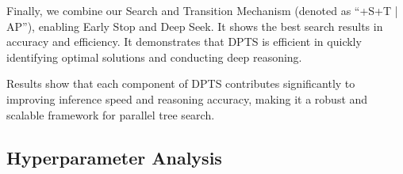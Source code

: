 Finally, we combine our Search and Transition Mechanism (denoted as ``+S+T | AP''), enabling Early Stop and Deep Seek. It shows the best search results in accuracy and efficiency. 
It demonstrates that DPTS is efficient in quickly identifying optimal solutions and conducting deep reasoning. 

Results show that each component of DPTS contributes significantly to improving inference speed and reasoning accuracy, making it a robust and scalable framework for parallel tree search. 




\subsection{Hyperparameter Analysis}

\begin{table}
    \centering
    \caption{Hyperparameter $\lambda_\mathrm{es}$ and $\lambda_\mathrm{ds}$ in transition thresholds $\theta_\mathrm{es}$ and $\theta_\mathrm{ds}$. ``ES (Early Stop)~\%'' and ``DS (Deep Seek)~\%'' are the ratios of the node type transition between the exploitation and exploration. More results can be found in Appendix~\ref{sec:app:hyperparameter}. }
    \vspace{-0.05in}
    \label{tab:hyperparameter}
    \vspace{-0.12in}
\end{table}

